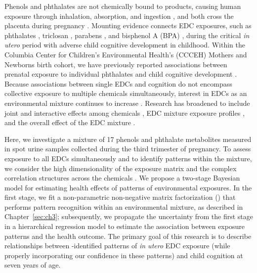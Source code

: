Phenols and phthalates are not chemically bound to products, causing human exposure through inhalation, absorption, and ingestion \citep{vandenberg2007human}, and both cross the placenta during pregnancy \citep{schonfelder2002parent, mose2007phthalate}. Mounting evidence connects EDC exposures, such as phthalates \citep{van2020phthalate, nidens2020prenatal, kim2018association, doherty2017prenatal, kim2011prenatal}, triclosan \citep{jackson2018identifying, guo2020early}, parabens \citep{freire2020association}, and bisphenol A (BPA) \citep{jiang2020prenatal, lin2017prenatal}, during the critical \textit{in utero} period with adverse child cognitive development in childhood. Within the Columbia Center for Children’s Environmental Health's (CCCEH) Mothers and Newborns birth cohort, we have previously reported associations between prenatal exposure to individual phthalates and child cognitive development \citep{factor2014persistent, whyatt2012maternal}. Because associations between single EDCs and cognition do not encompass collective exposure to multiple chemicals simultaneously, interest in EDCs as an environmental mixture continues to increase \citep{braun2016can, taylor16}. Research has broadened to include joint and interactive effects among chemicals \citep{hu2021prenatal}, EDC mixture exposure profiles \citep{kalloo2021chemical}, and the overall effect of the EDC mixture \citep{tanner2020early}.

Here, we investigate a mixture of 17 phenols and phthalate metabolites measured in spot urine samples collected during the third trimester of pregnancy. To assess exposure to all EDCs simultaneously and to identify patterns within the mixture, we consider the high dimensionality of the exposure matrix and the complex correlation structures across the chemicals \citep{taylor16}. We propose a two-stage Bayesian model for estimating health effects of patterns of environmental exposures. In the first stage, we fit a non-parametric non-negative matrix factorization (\bnmfc) that performs pattern recognition within an environmental mixture, as described in Chapter~\ref{sec:ch3}; subsequently, we propagate the uncertainty from the first stage in a hierarchical regression model to estimate the association between exposure patterns and the health outcome. The primary goal of this research is to describe relationships between \bnmfc-identified patterns of \textit{in utero} EDC exposure (while properly incorporating our confidence in these patterns) and child cognition at seven years of age.

